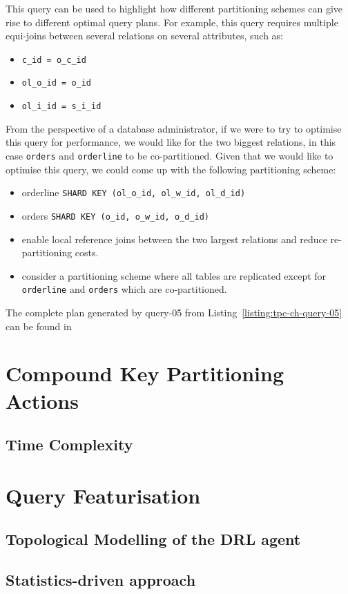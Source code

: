 This query can be used to highlight how different partitioning schemes can give rise to different optimal query plans. For example, this query requires multiple equi-joins between several relations on several attributes, such as:
    \begin{itemize}
        \item \texttt{c\_id = o\_c\_id}
        \item \texttt{ol\_o\_id = o\_id}
        \item \texttt{ol\_i\_id = s\_i\_id}
    \end{itemize}
From the perspective of a database administrator, if we were to try to optimise this query for performance, we would like for the two biggest relations, in this case \texttt{orders} and \texttt{orderline} to be co-partitioned. Given that we would like to optimise this query, we could come up with the following partitioning scheme:
    \begin{itemize}
        \item orderline \texttt{SHARD KEY (ol\_o\_id, ol\_w\_id, ol\_d\_id)}
        \item orders \texttt{SHARD KEY (o\_id, o\_w\_id, o\_d\_id)}
        \item enable local reference joins between the two largest relations and reduce re-partitioning costs.
        \item consider a partitioning scheme where all tables are replicated except for \texttt{orderline} and \texttt{orders} which are co-partitioned.
    \end{itemize}

The complete plan generated by query-05 from Listing~\ref{listing:tpc-ch-query-05} can be found in    

\section{Compound Key Partitioning Actions}

\subsection{Time Complexity}

\section{Query Featurisation}

\subsection{Topological Modelling of the DRL agent}

\subsection{Statistics-driven approach}
